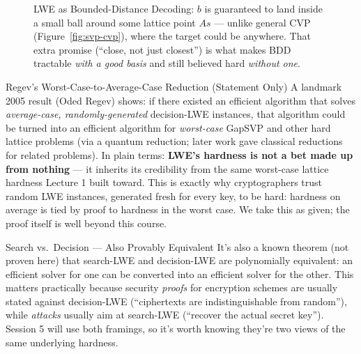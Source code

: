 \begin{figure}[h]
\centering
{}
\caption{LWE as Bounded-Distance Decoding: $b$ is guaranteed to land inside a small ball around some lattice point $As$ --- unlike general CVP (Figure~\ref{fig:svp-cvp}), where the target could be anywhere. That extra promise (``close, not just closest'') is what makes BDD tractable \emph{with a good basis} and still believed hard \emph{without one}.}
\label{fig:bdd}
\end{figure}

\begin{factbox}{Regev's Worst-Case-to-Average-Case Reduction (Statement Only)}
A landmark 2005 result (Oded Regev) shows: if there existed an efficient algorithm that solves \emph{average-case, randomly-generated} decision-LWE instances, that algorithm could be turned into an efficient algorithm for \emph{worst-case} GapSVP and other hard lattice problems (via a quantum reduction; later work gave classical reductions for related problems). In plain terms: \textbf{LWE's hardness is not a bet made up from nothing} --- it inherits its credibility from the same worst-case lattice hardness Lecture 1 built toward. This is exactly why cryptographers trust random LWE instances, generated fresh for every key, to be hard: hardness on average is tied by proof to hardness in the worst case. We take this as given; the proof itself is well beyond this course.
\end{factbox}



\begin{previewbox}{Search vs.\ Decision --- Also Provably Equivalent}
It's also a known theorem (not proven here) that search-LWE and decision-LWE are polynomially equivalent: an efficient solver for one can be converted into an efficient solver for the other. This matters practically because security \emph{proofs} for encryption schemes are usually stated against decision-LWE (``ciphertexts are indistinguishable from random''), while \emph{attacks} usually aim at search-LWE (``recover the actual secret key''). Session 5 will use both framings, so it's worth knowing they're two views of the same underlying hardness.
\end{previewbox}

